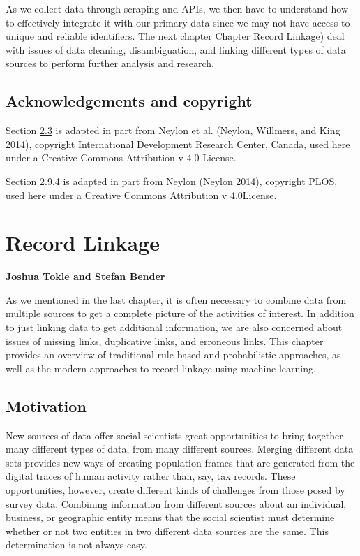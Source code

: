 \documentclass[]{krantz}
\begin{document}
As we collect data through scraping and APIs, we then have to understand
how to effectively integrate it with our primary data since we may not
have access to unique and reliable identifiers. The next chapter Chapter
\protect\hyperlink{chap:link}{Record Linkage}) deal with issues of data
cleaning, disambiguation, and linking different types of data sources to
perform further analysis and research.

\section{Acknowledgements and
copyright}\label{acknowledgements-and-copyright}

Section \protect\hyperlink{sec:4-2}{2.3} is adapted in part from Neylon
et al. (Neylon, Willmers, and King
\protect\hyperlink{ref-neylon2014scap}{2014}), copyright International
Development Research Center, Canada, used here under a Creative Commons
Attribution v 4.0 License.

Section \protect\hyperlink{sec:4-7.1.4}{2.9.4} is adapted in part from
Neylon (Neylon \protect\hyperlink{ref-neylon2014plosaltmetrics}{2014}),
copyright PLOS, used here under a Creative Commons Attribution v
4.0License.

\hypertarget{chap:link}{\chapter{Record Linkage}\label{chap:link}}

\textbf{Joshua Tokle and Stefan Bender}

As we mentioned in the last chapter, it is often necessary to combine
data from multiple sources to get a complete picture of the activities
of interest. In addition to just linking data to get additional
information, we are also concerned about issues of missing links,
duplicative links, and erroneous links. This chapter provides an
overview of traditional rule-based and probabilistic approaches, as well
as the modern approaches to record linkage using machine learning.

\section{Motivation}\label{motivation}

New sources of data offer social scientists great opportunities to bring
together many different types of data, from many different sources.
Merging different data sets provides new ways of creating population
frames that are generated from the digital traces of human activity
rather than, say, tax records. These opportunities, however, create
different kinds of challenges from those posed by survey data. Combining
information from different sources about an individual, business, or
geographic entity means that the social scientist must determine whether
or not two entities in two different data sources are the same. This
determination is not always easy.
\end{document}
